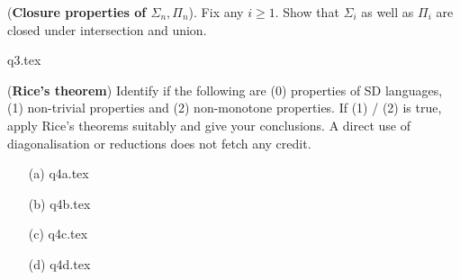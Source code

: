 \documentclass[12pt, a4paper,answers]{exam}
\begin{document}
\begin{questions}
\question[10] (\textbf{Closure properties of $\Sigma_n, \Pi_n$}). Fix any $i \ge 1$. Show that $\Sigma_i$ as well as $\Pi_i$ are closed under intersection and union.
		
	
	\begin{solution}
		{q3.tex}
	\end{solution}

	
\question [20] (\textbf{Rice's theorem}) Identify if the following are (0) properties of SD languages, (1) non-trivial properties and (2) non-monotone properties. If (1) / (2) is true, apply Rice's theorems suitably and give your conclusions. A direct use of diagonalisation or reductions does not fetch any credit.



\begin{solution}
	\begin{enumerate}
		\item[(a)] {q4a.tex}
		\item[(b)] {q4b.tex}
		\item[(c)] {q4c.tex}
		\item[(d)] {q4d.tex}
	\end{enumerate}
\end{solution}


\end{questions}
\end{document}
